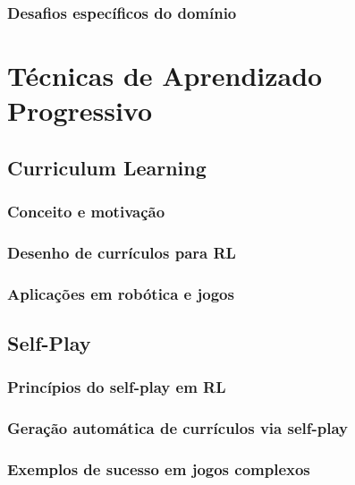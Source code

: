 \subsubsection{Desafios específicos do domínio}
\label{subsubsec:desafios_dominio}

\section{Técnicas de Aprendizado Progressivo}
\label{sec:aprendizado_prog}

\subsection{Curriculum Learning}
\label{subsec:curriculum}

\subsubsection{Conceito e motivação}
\label{subsubsec:curriculum_conceito}

\subsubsection{Desenho de currículos para RL}
\label{subsubsec:curriculum_desenho}

\subsubsection{Aplicações em robótica e jogos}
\label{subsubsec:curriculum_aplicacoes}

\subsection{Self-Play}
\label{subsec:self_play}

\subsubsection{Princípios do self-play em RL}
\label{subsubsec:self_play_principios}

\subsubsection{Geração automática de currículos via self-play}
\label{subsubsec:self_play_curriculos}

\subsubsection{Exemplos de sucesso em jogos complexos}
\label{subsubsec:self_play_exemplos}

